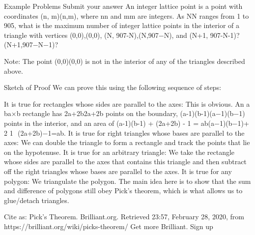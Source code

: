 \begin{problem}
Example Problems
Submit your answer
An integer lattice point is a point with coordinates (n, m)(n,m), where nn and mm are integers. As NN ranges from 1 to 905, what is the maximum number of integer lattice points in the interior of a triangle with vertices (0,0),(0,0), (N, 907-N),(N,907−N), and (N+1, 907-N-1)?(N+1,907−N−1)?

Note: The point (0,0)(0,0) is not in the interior of any of the triangles described above.

Sketch of Proof
We can prove this using the following sequence of steps:

It is true for rectangles whose sides are parallel to the axes: This is obvious. An a \times ba×b rectangle has 2a+2b2a+2b points on the boundary, (a-1)(b-1)(a−1)(b−1) points in the interior, and an area of (a-1)(b-1) +  (2a+2b) - 1 = ab(a−1)(b−1)+ 
2
1
​	
 (2a+2b)−1=ab.
It is true for right triangles whose bases are parallel to the axes: We can double the triangle to form a rectangle and track the points that lie on the hypotenuse.
It is true for an arbitrary triangle: We take the rectangle whose sides are parallel to the axes that contains this triangle and then subtract off the right triangles whose bases are parallel to the axes.
It is true for any polygon: We triangulate the polygon.
The main idea here is to show that the sum and difference of polygons still obey Pick's theorem, which is what allows us to glue/detach triangles.

Cite as: Pick's Theorem. Brilliant.org. Retrieved 23:57, February 28, 2020, from https://brilliant.org/wiki/picks-theorem/
Get more Brilliant. Sign up
\end{problem}
%

